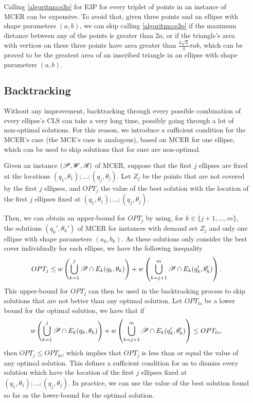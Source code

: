 Calling \autoref{algoritmo:e3p} for E3P for every triplet of points in an instance of MCER can be expensive. To avoid that, given three points and an ellipse with shape parameters $(a, b)$, we can skip calling \autoref{algoritmo:e3p} if the maximum distance between any of the points is greater than $2a$, or if the triangle's area with vertices on these three points have area greater than $\frac{3\sqrt{3}}{4}\pi ab$, which can be proved to be the greatest area of an inscribed triangle in an ellipse with shape parameters $(a, b)$.

\subsection{Backtracking}

Without any improvement, backtracking through every possible combination of every ellipse's CLS can take a very long time, possibly going through a lot of non-optimal solutions. 
For this reason, we introduce a sufficient condition for the MCER's case (the MCE's case is analogous), based on MCER for one ellipse, which can be used to skip solutions that for sure are non-optimal.

Given an instance $(\mathscr{P}, \mathscr{W}, \mathscr{R})$ of MCER, suppose that the first $j$ ellipses are fixed at the locations $(q_1, \theta_1); \dots; (q_j, \theta_j)$.
Let $Z_j$ be the points that are not covered by the first $j$ ellipses, and $OPT_j$ the value of the best solution with the location of the first $j$ ellipses fixed at $(q_1, \theta_1); \dots; (q_j, \theta_j)$.

Then, we can obtain an upper-bound for $OPT_j$ by using, for $k\in\{j+1, \dots, m\}$, the solutions $(q_k', \theta_k')$ of MCER for instances with demand set $Z_j$ and only one ellipse with shape parameters $(a_k, b_k)$. As these solutions only consider the best cover individually for each ellipse, we have the following inequality
\begin{equation}
OPT_j \le w\left(\bigcup_{k=1}^{j} \mathscr{P} \cap E_k(q_k, \theta_k)\right) + w\left(\bigcup_{k=j+1}^{m} \mathscr{P} \cap E_k(q_k', \theta_k')\right).
\end{equation}
This upper-bound for $OPT_j$ can then be used in the backtracking process to skip solutions that are not better than any optimal solution. Let $OPT_{lo}$ be a lower bound for the optimal solution, we have that if
\begin{equation}
\label{eq:upper-bound}
w\left(\bigcup_{k=1}^{j} \mathscr{P} \cap E_k(q_k, \theta_k)\right) +w\left(\bigcup_{k=j+1}^{m} \mathscr{P} \cap E_k(q_k', \theta_k')\right) \le OPT_{lo},
\end{equation}
then $OPT_j \le OPT_{lo}$, which implies that $OPT_j$ is less than or equal the value of any optimal solution. This defines a sufficient condition for us to dismiss every solution which have the location of the first $j$ ellipses fixed at $(q_1, \theta_1); \dots; (q_j, \theta_j)$. In practice, we can use the value of the best solution found so far as the lower-bound for the optimal solution.

